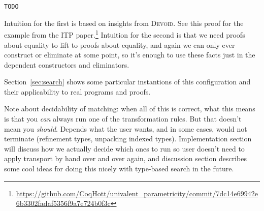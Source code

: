 \begin{lstlisting}
TODO
\end{lstlisting}
Intuition for the first is based on insights from \textsc{Devoid}.
See this proof for the example from the ITP paper.\footnote{\url{https://github.com/CoqHott/univalent_parametricity/commit/7dc14e69942e6b3302fadaf5356f9a7e724b0f3c}}
Intuition for the second is that we need proofs about equality to lift to proofs about equality,
and again we can only ever construct or eliminate at some point, so it's enough
to use these facts just in the dependent constructors and eliminators.

Section~\ref{sec:search} shows some particular instantions of this configuration and their applicability to real programs and proofs.

Note about decidability of matching: when all of this is correct, what this means is that you \textit{can} always
run one of the transformation rules. But that doesn't mean you \textit{should}. Depends what the user wants,
and in some cases, would not terminate (refinement types, unpacking indexed types). Implementation section will
discuss how we actually decide which ones to run so user doesn't need to apply transport by hand over and over again,
and discussion section describes some cool ideas for doing this nicely with type-based search in the future.




